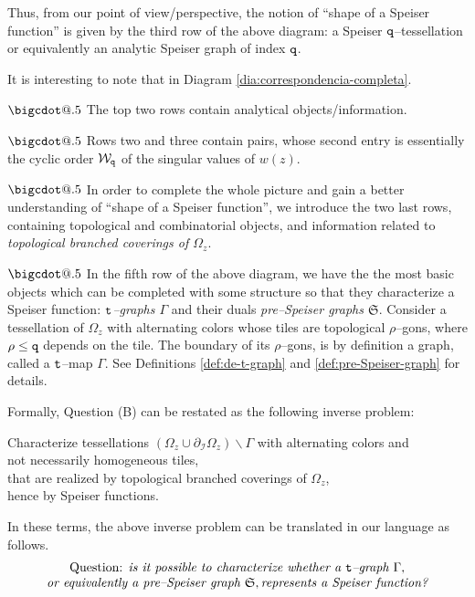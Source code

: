 \documentclass[final,3p,times]{elsarticle}
\makeatletter
\newcommand*\bigcdot{\mathpalette\bigcdot@{.5}}
\newcommand*\bigcdot@[2]{\mathbin{\vcenter{\hbox{\scalebox{#2}{$\m@th#1\bullet$}}}}}
\theoremstyle{definition}
\makeatother
\begin{document}
\noindent
Thus, from our point of view/perspective, the notion of 
``shape of a Speiser function''
is given by 
the third row of the above diagram:
a Speiser $\tt q$--tessellation or equivalently
an analytic Speiser graph of index $\tt q$.

It is interesting to note that in Diagram \ref{dia:correspondencia-completa}.

\noindent
$\bigcdot$ 
The top two rows contain analytical objects/information.

\noindent
$\bigcdot$ 
Rows two and three contain pairs, whose second entry is essentially the cyclic order $\mathcal{W}_{\tt q}$
of the singular values of $w(z)$.

\noindent
$\bigcdot$ 
In order to complete the whole picture and gain a better understanding of 
``shape of a Speiser function'', we introduce the two last rows,
containing topological and combinatorial objects, 
and information related to 
\emph{topological branched coverings of $\Omega_z$}.

\noindent
$\bigcdot$ 
In the fifth row of the above diagram, we have the
the most basic objects which can be completed with some structure
so that they characterize a Speiser function:
\emph{$\tt t$--graphs $\Gamma$} and their duals 
\emph{pre--Speiser graphs $\mathfrak{S}$}.
Consider a 
tessellation of $\Omega_z$ with alternating colors 
whose tiles are topological $\rho$--gons, 
where $\rho \leq {\tt q}$ depends on the tile.
The boundary of its $\rho$--gons, is by definition 
a graph, called a $\tt t$--map $\Gamma$.
See Definitions \ref{def:de-t-graph} 
and \ref{def:pre-Speiser-graph} for details.

\medskip
Formally, Question (B) can be restated as
the following inverse problem:

{\it
\begin{center}
Characterize tessellations 
$(\Omega_z \cup \partial_{\mathcal{I}} \Omega_z )\backslash \Gamma$
with alternating colors and 
\\
not necessarily homogeneous tiles, 
\\
that are realized by topological branched 
coverings of $\Omega_z$, 
\\
hence by Speiser functions.
\end{center}
}

\noindent
In these terms, the above inverse problem 
can be translated in our language as follows.
\begin{equation}
\label{eq:pregunta-mosaico-speiser}
\begin{array}{c}
\text{Question: \it is it possible to characterize whether a 
{\tt t}--graph }\Gamma, 
\\
\text{\it or equivalently a pre--Speiser graph }\mathfrak{S},
\text{\it represents a Speiser function?}
\end{array}
\end{equation}
\end{document}

